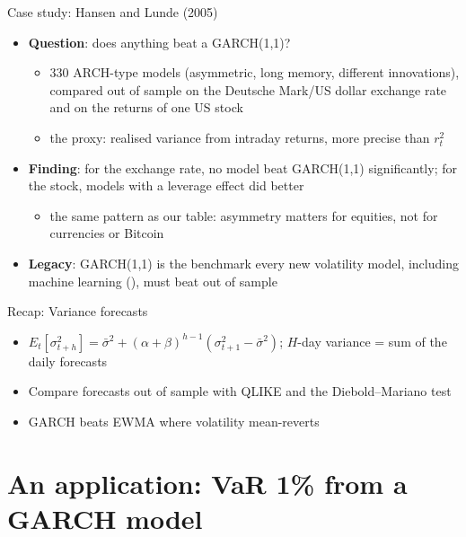 \begin{frame}{Case study: Hansen and Lunde (2005)}
\itemsize{\small}
\begin{itemize}
    \item \textbf{Question}: does anything beat a GARCH(1,1)? 
    \begin{itemize}
        \item 330 ARCH-type models (asymmetric, long memory, different innovations), compared out of sample on the Deutsche Mark/US dollar exchange rate and on the returns of one US stock
        \item the proxy: realised variance from intraday returns, more precise than $r_t^2$
    \end{itemize}
    \item \textbf{Finding}: for the exchange rate, no model beat GARCH(1,1) significantly; for the stock, models with a leverage effect did better
    \begin{itemize}
        \item the same pattern as our table: asymmetry matters for equities, not for currencies or Bitcoin
    \end{itemize}
    \item \textbf{Legacy}: GARCH(1,1) is the benchmark every new volatility model, including machine learning (), must beat out of sample
\end{itemize}
\end{frame}

\begin{frame}{Recap: Variance forecasts}
\itemsize{\small}
\begin{itemize}
    \item $E_t[\sigma_{t+h}^2] = \bar\sigma^2 + (\alpha + \beta)^{h-1}(\sigma_{t+1}^2 - \bar\sigma^2)$; $H$-day variance = sum of the daily forecasts
    \item Compare forecasts out of sample with QLIKE and the Diebold--Mariano test
    \item GARCH beats EWMA where volatility mean-reverts
\end{itemize}
\end{frame}


\section{An application: VaR 1\% from a GARCH model}

